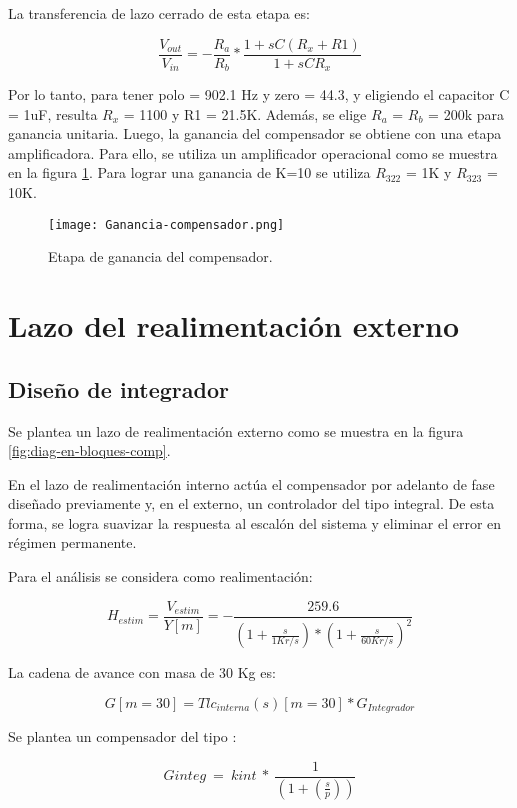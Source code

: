 \noindent La transferencia de lazo cerrado de esta etapa es:

\begin{equation} 
	\frac{V_{out}}{V_{in}}= - \frac{R_a}{R_b}*\frac{1+sC(R_x+R1)}{1+sCR_x}
\end{equation}

\noindent Por lo tanto, para tener polo = 902.1 Hz y zero = 44.3, y eligiendo el capacitor C = 1uF, resulta $R_x$ = 1100 y R1 = 21.5K. Además, se elige $R_a$ = $R_b$ = 200k para ganancia unitaria. Luego, la ganancia del compensador se obtiene con una etapa amplificadora.
Para ello, se utiliza un amplificador operacional como se muestra en la figura \ref{fig:ganancia-compensador}. Para lograr una ganancia de K=10 se utiliza $R_{322}$ = 1K y $R_{323}$ = 10K.


\begin{figure}[H]
	\centering
	\texttt{[image: Ganancia-compensador.png]}
	\caption{Etapa de ganancia del compensador.}
	\label{fig:ganancia-compensador}
\end{figure}

\section{Lazo del realimentación externo}
\subsection{Diseño de integrador}

\noindent Se plantea un lazo de realimentaci\'{o}n externo como se muestra en la  figura \ref{fig:diag-en-bloques-comp}.

\noindent En el lazo de realimentaci\'{o}n interno act\'{u}a el compensador por adelanto de fase dise\~{n}ado previamente y, en el externo, un controlador del tipo integral. De esta forma, se logra suavizar la respuesta al escal\'{o}n del sistema y eliminar el error en r\'{e}gimen permanente.


\noindent Para el an\'{a}lisis se considera como realimentaci\'{o}n: 

\[H_{estim}=\frac{V_{estim}}{Y[m]}= - \frac{259.6}{(1 + \frac{s}{1Kr/s})*(1+\frac{s}{60Kr/s})^2}\] 

\noindent La cadena de avance con masa de 30 Kg es:

\[G[m=30]=Tlc_{interna}(s)[m=30]*G_{Integrador}\] 

\noindent Se  plantea un compensador del tipo :

\[Ginteg\ =\ kint\ *\ \frac{1}{(1+(\frac{s}{p}))}\]

